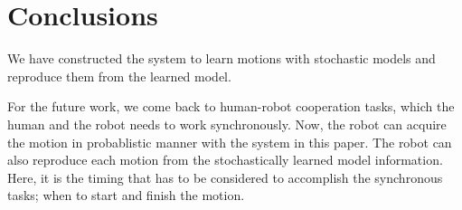 \section{Conclusions}

We have constructed the system to learn motions with stochastic models and reproduce them from the learned model.

For the future work, we come back to human-robot cooperation tasks, which the human and the robot needs to work synchronously. Now, the robot can acquire the motion in probablistic manner with the system in this paper. The robot can also reproduce each motion from the stochastically learned model information. Here, it is the timing that has to be considered to accomplish the synchronous tasks; when to start and finish the motion.
